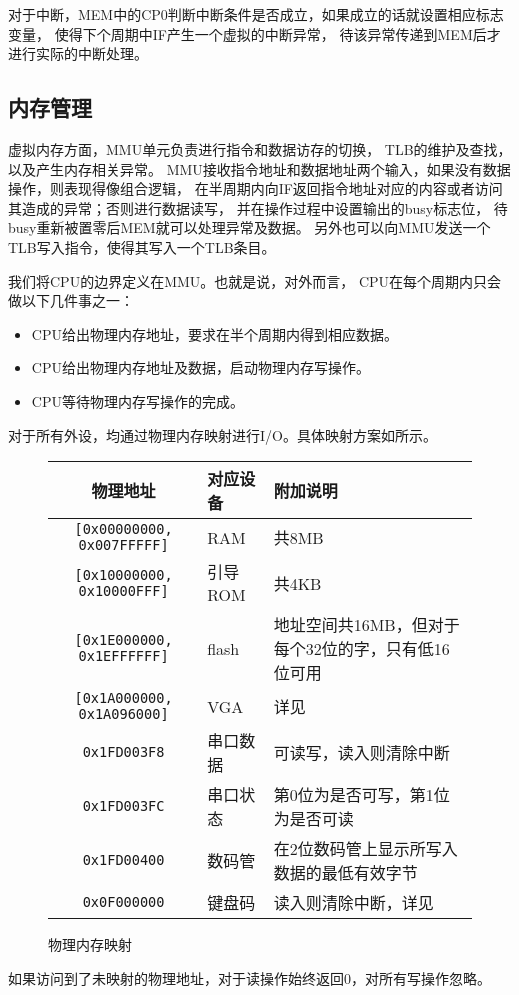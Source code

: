 对于中断，MEM中的CP0判断中断条件是否成立，如果成立的话就设置相应标志变量，
使得下个周期中IF产生一个虚拟的中断异常，
待该异常传递到MEM后才进行实际的中断处理。

\subsection{内存管理}
虚拟内存方面，MMU单元负责进行指令和数据访存的切换，
TLB的维护及查找，以及产生内存相关异常。
MMU接收指令地址和数据地址两个输入，如果没有数据操作，则表现得像组合逻辑，
在半周期内向IF返回指令地址对应的内容或者访问其造成的异常；否则进行数据读写，
并在操作过程中设置输出的busy标志位，
待busy重新被置零后MEM就可以处理异常及数据。
另外也可以向MMU发送一个TLB写入指令，使得其写入一个TLB条目。

我们将CPU的边界定义在MMU。也就是说，对外而言，
CPU在每个周期内只会做以下几件事之一： 
\begin{itemize}
	\item CPU给出物理内存地址，要求在半个周期内得到相应数据。
	\item CPU给出物理内存地址及数据，启动物理内存写操作。
	\item CPU等待物理内存写操作的完成。
\end{itemize}

对于所有外设，均通过物理内存映射进行I/O。具体映射方案如所示。
\begin{figure}[!ht]
	\begin{center}\begin{tabular}{cll}
		\hline
		物理地址 & 对应设备 & 附加说明 \\ \hline
		\verb|[0x00000000, 0x007FFFFF]| & RAM & 共8MB \\ 
		\verb|[0x10000000, 0x10000FFF]| & 引导ROM & 共4KB \\
		\verb|[0x1E000000, 0x1EFFFFFF]| & flash & 
			地址空间共16MB，但对于每个32位的字，只有低16位可用 \\
		\verb|[0x1A000000, 0x1A096000]| & VGA & 详见\secref{vga} \\
		\verb|0x1FD003F8|	& 串口数据	& 可读写，读入则清除中断 \\
		\verb|0x1FD003FC|	& 串口状态	& 第0位为是否可写，第1位为是否可读 \\
		\verb|0x1FD00400|	& 数码管	&
			在2位数码管上显示所写入数据的最低有效字节 \\
		\verb|0x0F000000|	& 键盘码	& 读入则清除中断，详见\secref{ps2} \\
		\hline
	\end{tabular}\end{center}
	\caption{\label{fig:iomap}物理内存映射}
\end{figure}
如果访问到了未映射的物理地址，对于读操作始终返回0，对所有写操作忽略。

